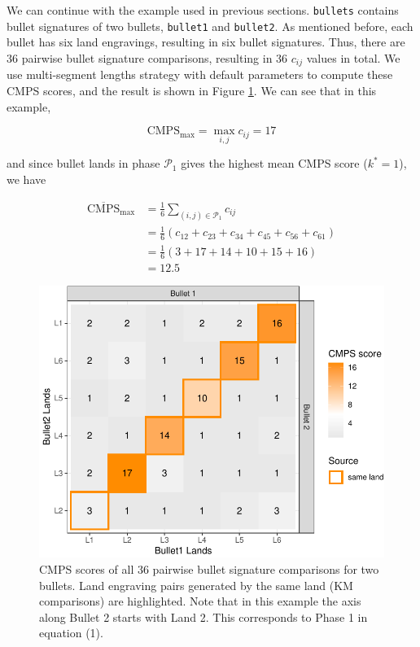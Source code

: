 We can continue with the example used in previous sections.
\texttt{bullets} contains bullet signatures of two bullets, \texttt{bullet1} and \texttt{bullet2}.
As mentioned before, each bullet has six land engravings, resulting in six bullet signatures.
Thus, there are 36 pairwise bullet signature comparisons, resulting in 36 \(c_{ij}\) values in total.
We use multi-segment lengths strategy with default parameters to compute these CMPS scores, and the result is shown in Figure \ref{fig:tiles}.
We can see that in this example,

\[
\mathrm{CMPS_{max}} =  \max_{i,j} c_{ij} = 17
\]

and since bullet lands in phase \(\mathcal{P}_1\) gives the highest mean CMPS score (\(k^* = 1\)), we have

\[
\begin{aligned}
\mathrm{\overline{CMPS}_{max}} &= \frac{1}{6} \sum_{(i,j) \in \mathcal{P}_1} c_{ij} \\
                        &= \frac{1}{6} \left(c_{12} + c_{23} + c_{34} + c_{45} + c_{56} + c_{61}\right) \\
                        &= \frac{1}{6} \left(3+17+14+10+15+16\right) \\
                        &= 12.5
\end{aligned}
\]

\begin{figure}

{\centering \includegraphics[width=.7\textwidth]{ju-hofmann_files/figure-latex/tiles-1} 

}

\caption{CMPS scores of all 36 pairwise bullet signature comparisons for two bullets. Land engraving pairs generated by the same land (KM comparisons) are highlighted. Note that in this example the axis along Bullet 2 starts with Land 2. This corresponds to Phase 1 in equation (1).}\label{fig:tiles}
\end{figure}

